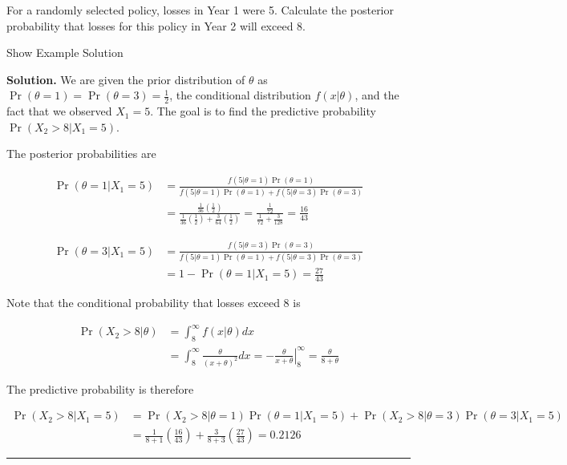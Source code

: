 \documentclass[]{book}
\theoremstyle{definition}
\theoremstyle{definition}
\theoremstyle{definition}
\theoremstyle{remark}
\begin{document}
For a randomly selected policy, losses in Year 1 were 5. Calculate the
posterior probability that losses for this policy in Year 2 will exceed
8.

Show Example Solution

\hypertarget{toggleExampleSelect.4.4}{}
\textbf{Solution.} We are given the prior distribution of \(\theta\) as
\(\Pr(\theta=1)=\Pr(\theta=3)=\frac{1}{2}\), the conditional
distribution \(f(x|\theta)\), and the fact that we observed \(X_1=5\).
The goal is to find the predictive probability \(\Pr(X_2>8|X_1=5)\).

The posterior probabilities are

\[
\begin{aligned}
\Pr(\theta=1|X_1=5) &= \frac{f(5|\theta=1)\Pr(\theta=1)}{f(5|\theta=1)\Pr(\theta=1) + f(5|\theta=3)\Pr(\theta=3)} \\
&= \frac{\frac{1}{36}(\frac{1}{2})}{\frac{1}{36}(\frac{1}{2})+\frac{3}{64}(\frac{1}{2})} = \frac{\frac{1}{72}}{\frac{1}{72} + \frac{3}{128}} = \frac{16}{43}
\end{aligned}
\]

\[
\begin{aligned}
\Pr(\theta=3|X_1=5) &= \frac{f(5|\theta=3)\Pr(\theta=3)}{f(5|\theta=1)\Pr(\theta=1) + f(5|\theta=3)\Pr(\theta=3)} \\
&= 1-\Pr(\theta=1|X_1=5) = \frac{27}{43}
\end{aligned}
\]

Note that the conditional probability that losses exceed 8 is

\[
\begin{aligned}
\Pr(X_2>8|\theta) &= \int_8^\infty f(x|\theta)dx \\
&= \int_8^\infty \frac{\theta}{(x+\theta)^2}dx = \left. -\frac{\theta}{x+\theta} \right|_8^\infty = \frac{\theta}{8 + \theta}
\end{aligned}
\]

The predictive probability is therefore

\[
\begin{aligned}
\Pr(X_2>8|X_1=5) &= \Pr(X_2>8|\theta=1) \Pr(\theta=1|X_1=5) + \Pr(X_2>8|\theta=3) \Pr(\theta=3 | X_1=5) \\
&= \frac{1}{8+1}\left( \frac{16}{43}\right) + \frac{3}{8+3} \left( \frac{27}{43}\right) = 0.2126
\end{aligned}
\]

\begin{center}\rule{0.5\linewidth}{\linethickness}\end{center}
\end{document}
